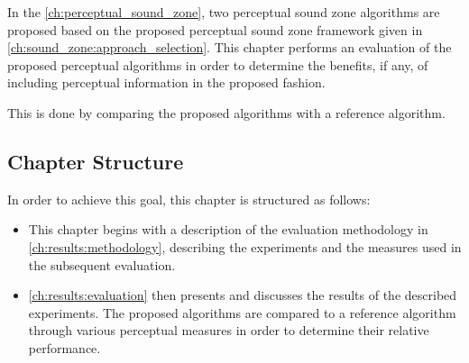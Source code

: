 In the \autoref{ch:perceptual_sound_zone}, two perceptual sound zone algorithms are proposed based 
on the proposed perceptual sound zone framework given in \autoref{ch:sound_zone:approach_selection}.
This chapter performs an evaluation of the proposed perceptual algorithms in order to determine the benefits, 
if any, of including perceptual information in the proposed fashion.

This is done by comparing the proposed algorithms with a reference algorithm.

\subsection*{Chapter Structure}
In order to achieve this goal, this chapter is structured as follows:

\begin{itemize}
    \item This chapter begins with a description of the evaluation methodology in 
        \autoref{ch:results:methodology}, describing the experiments 
        and the measures used in the subsequent evaluation.
    \item \autoref{ch:results:evaluation} then presents and discusses the results of the described experiments. 
        The proposed algorithms are compared to a reference algorithm through various 
        perceptual measures in order to determine their relative performance.
\end{itemize}
